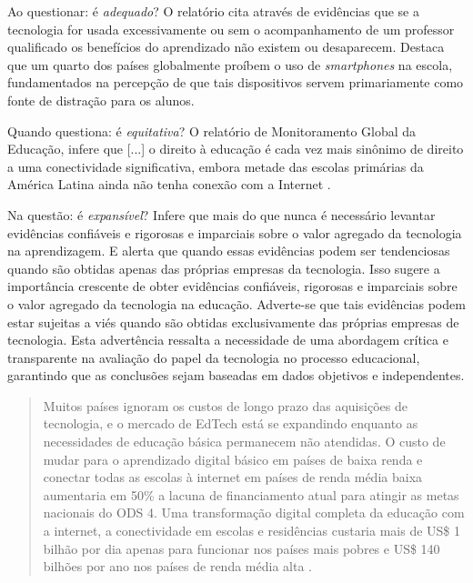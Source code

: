 \documentclass[portuguese]{textolivre}
\begin{document}
Ao questionar: é \textit{adequado}? O relatório cita através de evidências que se a tecnologia for usada excessivamente ou sem o acompanhamento de um professor qualificado os benefícios do aprendizado não existem ou desaparecem. Destaca que um quarto dos países globalmente proíbem o uso de \textit{smartphones} na escola, fundamentados na percepção de que tais dispositivos servem primariamente como fonte de distração para os alunos.

Quando questiona: é \textit{equitativa}? O relatório de Monitoramento Global da Educação, infere que [...] o direito à educação é cada vez mais sinônimo de direito a uma conectividade significativa, embora metade das escolas primárias da América Latina ainda não tenha conexão com a Internet \cite[p. 2]{campanha_nacional_do_direito_a_educacao_nota_nodate}.

Na questão: é \textit{expansível}? Infere que mais do que nunca é necessário levantar evidências confiáveis e rigorosas e imparciais sobre o valor agregado da tecnologia na aprendizagem. E alerta que quando essas evidências podem ser tendenciosas quando são obtidas apenas das próprias empresas da tecnologia. Isso sugere a importância crescente de obter evidências confiáveis, rigorosas e imparciais sobre o valor agregado da tecnologia na educação. Adverte-se que tais evidências podem estar sujeitas a viés quando são obtidas exclusivamente das próprias empresas de tecnologia. Esta advertência ressalta a necessidade de uma abordagem crítica e transparente na avaliação do papel da tecnologia no processo educacional, garantindo que as conclusões sejam baseadas em dados objetivos e independentes.

\begin{quote}
    Muitos países ignoram os custos de longo prazo das aquisições de tecnologia, e o mercado de EdTech está se expandindo enquanto as necessidades de educação básica permanecem não atendidas. O custo de mudar para o aprendizado digital básico em países de baixa renda e conectar todas as escolas à internet em países de renda média baixa aumentaria em 50\% a lacuna de financiamento atual para atingir as metas nacionais do ODS 4. Uma transformação digital completa da educação com a internet, a conectividade em escolas e residências custaria mais de US\$ 1 bilhão por dia apenas para funcionar nos países mais pobres e US\$ 140 bilhões por ano nos países de renda média alta \cite[p. 2]{campanha_nacional_do_direito_a_educacao_nota_nodate}.
\end{quote}
\end{document}
